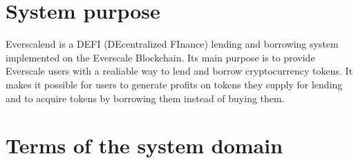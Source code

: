 

\section{System purpose}

Everscalend is a DEFI (DEcentralized FInance) lending and borrowing system implemented on the Everscale Blockchain. Its main purpose is to provide Everscale users with a realiable way to lend and borrow cryptocurrency tokens. It makes it possible for users to generate profits on tokens they supply for lending and to acquire tokens by borrowing them instead of buying them.

\section{Terms of the system domain}


